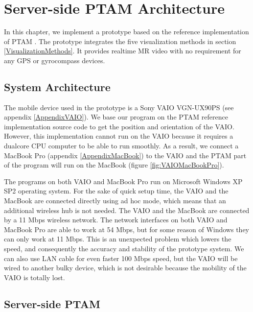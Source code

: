 \chapter{Server-side PTAM Architecture}
\label{Chapter3}

In this chapter, we implement a prototype based on the reference implementation of PTAM \cite{Reference12}. The prototype integrates the five visualization methods in section \ref{VisualizationMethods}. It provides realtime MR video with no requirement for any GPS or gyrocompass devices.


\section{System Architecture}

The mobile device used in the prototype is a Sony VAIO VGN-UX90PS (see appendix \ref{AppendixVAIO}). We base our program on the PTAM reference implementation source code \cite{Reference16} to get the position and orientation of the VAIO. However, this implementation cannot run on the VAIO because it requires a dualcore CPU computer to be able to run smoothly. As a result, we connect a MacBook Pro (appendix \ref{AppendixMacBook}) to the VAIO and the PTAM part of the program will run on the MacBook (figure \ref{fig:VAIOMacBookPro}).

The programs on both VAIO and MacBook Pro run on Microsoft Windows XP SP2 operating system. For the sake of quick setup time, the VAIO and the MacBook are connected directly using ad hoc mode, which means that an additional wireless hub is not needed. The VAIO and the MacBook are connected by a 11 Mbps wireless network. The network interfaces on both VAIO and MacBook Pro are able to work at 54 Mbps, but for some reason of Windows they can only work at 11 Mbps. This is an unexpected problem which lowers the speed, and consequently the accuracy and stability of the prototype system. We can also use LAN cable for even faster 100 Mbps speed, but the VAIO will be wired to another bulky device, which is not desirable because the mobility of the VAIO is totally lost.


\section{Server-side PTAM}

